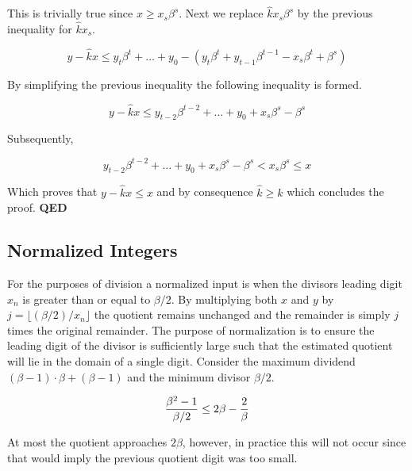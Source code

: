 \documentclass[b5paper]{book}
\begin{document}
This is trivially true since $x \ge x_s\beta^s$.  Next we replace $\hat kx_s\beta^s$ by the previous inequality for $\hat kx_s$.  

\begin{equation}
y - \hat k x \le y_t\beta^t + \ldots + y_0 - (y_t\beta^t + y_{t-1}\beta^{t-1} - x_s\beta^t + \beta^s)
\end{equation}

By simplifying the previous inequality the following inequality is formed.

\begin{equation}
y - \hat k x \le y_{t-2}\beta^{t-2} + \ldots + y_0 + x_s\beta^s - \beta^s
\end{equation}

Subsequently,

\begin{equation}
y_{t-2}\beta^{t-2} + \ldots +  y_0  + x_s\beta^s - \beta^s < x_s\beta^s \le x
\end{equation}

Which proves that $y - \hat kx \le x$ and by consequence $\hat k \ge k$ which concludes the proof.  \textbf{QED}


\subsection{Normalized Integers}
For the purposes of division a normalized input is when the divisors leading digit $x_n$ is greater than or equal to $\beta / 2$.  By multiplying both
$x$ and $y$ by $j = \lfloor (\beta / 2) / x_n \rfloor$ the quotient remains unchanged and the remainder is simply $j$ times the original
remainder.  The purpose of normalization is to ensure the leading digit of the divisor is sufficiently large such that the estimated quotient will
lie in the domain of a single digit.  Consider the maximum dividend $(\beta - 1) \cdot \beta + (\beta - 1)$ and the minimum divisor $\beta / 2$.  

\begin{equation} 
{{\beta^2 - 1} \over { \beta / 2}} \le 2\beta - {2 \over \beta} 
\end{equation}

At most the quotient approaches $2\beta$, however, in practice this will not occur since that would imply the previous quotient digit was too small.  
\end{document}
